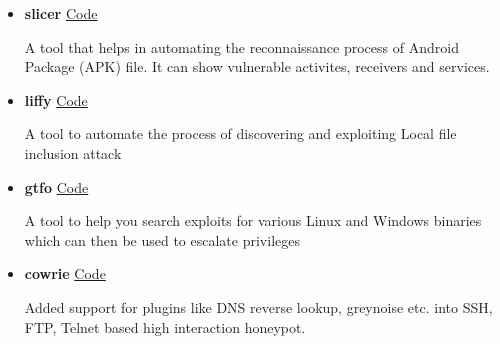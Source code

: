 \documentclass[10pt,a4paper,ragged2e]{altacv}
\begin{document}
  \begin{itemize}
  \item {\color{black} \normalsize \textbf{slicer}} \hfill {\color{accent} \faGithub \href{https://github.com/mzfr/slicer}{ \hspace{0.5mm}Code}}

  A tool that helps in automating the reconnaissance process of Android Package (APK) file. It can show vulnerable activites, receivers and services.

  \divider

  \item {\color{black} \normalsize \textbf{liffy}} \hfill {\color{accent} \faGithub \href{https://github.com/liffy}{ \hspace{0.5mm}Code}}

  A tool to automate the process of discovering and exploiting Local file inclusion attack

  \divider

  \item {\color{black} \normalsize \textbf{gtfo}} \hfill {\color{accent} \faGithub \href{https://github.com/gtfo}{ \hspace{0.5mm}Code}}

  A tool to help you search exploits for various Linux and Windows binaries which can then be used to escalate privileges

  \divider

  \item {\color{black} \normalsize \textbf{cowrie}} \hfill {\color{accent} \faGithub \href{https://github.com/cowrie/cowrie/commits?author=mzfr}{ \hspace{0.5mm}Code}}

  Added support for plugins like DNS reverse lookup, greynoise etc. into SSH, FTP, Telnet based high interaction honeypot.


  \end{itemize}

  \clearpage

  
\end{document}
